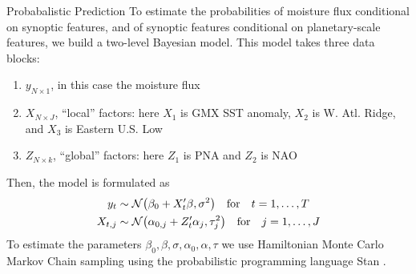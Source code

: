 \begin{block}{Probabalistic Prediction}
    To estimate the  probabilities of moisture flux conditional on synoptic features, and of synoptic features conditional on planetary-scale features, we build a two-level Bayesian model.
    This model takes three data blocks:
    \begin{enumerate}
        \item $y_{N \times 1}$, in this case the moisture flux
        \item $X_{N \times J}$, ``local'' factors: here $X_1$ is GMX SST anomaly, $X_2$ is W. Atl. Ridge, and $X_3$ is Eastern U.S. Low
        \item $Z_{N \times k}$, ``global'' factors: here $Z_1$ is PNA and $Z_2$ is NAO
    \end{enumerate}
    Then, the model is formulated as
    \begin{align}
        y_t & \sim \normal \qty(\beta_0 + X'_t \beta, \sigma^2) \qqtext{for} t = 1, \ldots, T \label{eq:yX}\\
        X_{t,j} &\sim \normal \qty(\alpha_{0,j} + Z'_t \alpha_j, \tau_j^2) \qqtext{for} j = 1, \ldots, J \label{eq:XZ}
    \end{align}
    To estimate the parameters $\beta_0, \beta, \sigma, \alpha_0, \alpha, \tau$ we use Hamiltonian Monte Carlo Markov Chain sampling using the probabilistic programming language Stan \cite{Carpenter2016}.
\end{block}
